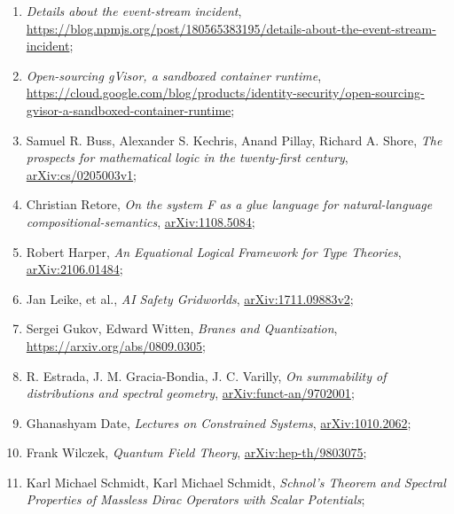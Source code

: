 \documentclass[a4paper,11pt]{article}
\begin{document}
\begin{enumerate}
\item \emph{Details about the event-stream incident},
  \href{https://blog.npmjs.org/post/180565383195/details-about-the-event-stream-incident}{https://blog.npmjs.org/post/180565383195/details-about-the-event-stream-incident};

\item \emph{Open-sourcing gVisor, a sandboxed container runtime},
  \href{https://cloud.google.com/blog/products/identity-security/open-sourcing-gvisor-a-sandboxed-container-runtime}{https://cloud.google.com/blog/products/identity-security/open-sourcing-gvisor-a-sandboxed-container-runtime};

\item Samuel R. Buss, Alexander S. Kechris, Anand Pillay, Richard A.
  Shore, \emph{The prospects for mathematical logic in the
    twenty-first century},
  \href{https://arxiv.org/abs/cs/0205003v1}{arXiv:cs/0205003v1};

\item Christian Retore, \emph{On the system F as a glue language for
    natural-language compositional-semantics},
  \href{https://arxiv.org/abs/1108.5084}{arXiv:1108.5084};

\item Robert Harper, \emph{An Equational Logical Framework for Type
    Theories},
  \href{https://arxiv.org/abs/2106.01484}{arXiv:2106.01484};

\item Jan Leike, et al., \emph{AI Safety Gridworlds},
  \href{https://arxiv.org/abs/1711.09883}{arXiv:1711.09883v2};

\item Sergei Gukov, Edward Witten, \emph{Branes and Quantization},
  \href{https://arxiv.org/abs/0809.0305}{https://arxiv.org/abs/0809.0305};

\item R. Estrada, J. M. Gracia-Bondia, J. C. Varilly, \emph{On
    summability of distributions and spectral geometry},
  \href{https://arxiv.org/abs/funct-an/9702001v1}{arXiv:funct-an/9702001};

\item Ghanashyam Date, \emph{Lectures on Constrained Systems},
  \href{https://arxiv.org/abs/1010.2062v1}{arXiv:1010.2062};

\item Frank Wilczek, \emph{Quantum Field Theory},
  \href{https://arxiv.org/abs/hep-th/9803075v2}{arXiv:hep-th/9803075};

\item Karl Michael Schmidt, Karl Michael Schmidt, \emph{Schnol’s
    Theorem and Spectral Properties of Massless Dirac Operators with
    Scalar Potentials};


\end{enumerate}
\end{document}
